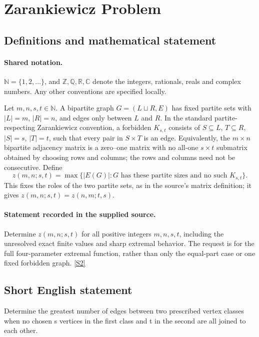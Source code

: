 \documentclass[11pt]{article}
\newcommand{\sref}[2]{\hyperlink{source:#1:#2}{[S#2]}}
\begin{document}
\section{Zarankiewicz Problem}\label{statement}

\subsection{Definitions and mathematical statement}

\paragraph{Shared notation.}$\mathbb N=\{1,2,\ldots\}$, and $\mathbb Z,\mathbb Q,\mathbb R,\mathbb C$ denote the integers, rationals, reals and complex numbers. Any other conventions are specified locally.


Let $m,n,s,t\in\mathbb N$. A bipartite graph $G=(L\sqcup R,E)$ has fixed partite sets with $|L|=m$, $|R|=n$, and edges only between $L$ and $R$. In the standard partite-respecting Zarankiewicz convention, a forbidden $K_{s,t}$ consists of $S\subseteq L$, $T\subseteq R$, $|S|=s$, $|T|=t$, such that every pair in $S\times T$ is an edge. Equivalently, the $m\times n$ bipartite adjacency matrix is a zero--one matrix with no all-one $s\times t$ submatrix obtained by choosing rows and columns; the rows and columns need not be consecutive. Define
\[
 z(m,n;s,t)=\max\{|E(G)|:G\text{ has these partite sizes and no such }K_{s,t}\}.
\]
This fixes the roles of the two partite sets, as in the source's matrix definition; it gives $z(m,n;s,t)=z(n,m;t,s)$.
\paragraph{Statement recorded in the supplied source.}
Determine $z(m,n;s,t)$ for all positive integers $m,n,s,t$, including the unresolved exact finite values and sharp extremal behavior. The request is for the full four-parameter extremal function, rather than only the equal-part case or one fixed forbidden graph. \sref{statement}{2}
\subsection{Short English statement}
Determine the greatest number of edges between two prescribed vertex classes when no chosen s vertices in the first class and t in the second are all joined to each other.
\end{document}
